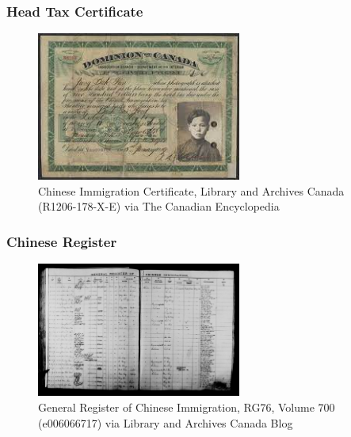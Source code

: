 \documentclass[xcolor=dvipsnames, compress, 12pt, aspectratio=169, handout]{beamer}
\begin{document}
\begin{frame}
    \label{fig_headtax}
    \frametitle{Head Tax Certificate \hyperlink{headtaxinfo}{}}
    \centering
    \begin{figure}
        \includegraphics[width = 0.6\textwidth]{../../figs/slides/headtax.jpeg}
        \caption{\footnotesize Chinese Immigration Certificate, Library and Archives Canada (R1206-178-X-E) via The Canadian Encyclopedia}
    \end{figure}
\end{frame}

\begin{frame}
    \label{fig_register}
    \frametitle{Chinese Register  \hyperlink{data}{}}
    \centering
    \begin{figure}
        \includegraphics[width = 0.6\textwidth]{../../figs/slides/register.jpeg}
        \caption{\footnotesize General Register of Chinese Immigration, RG76, Volume 700 (e006066717) via Library and Archives Canada Blog}
    \end{figure}
\end{frame}
\end{document}
